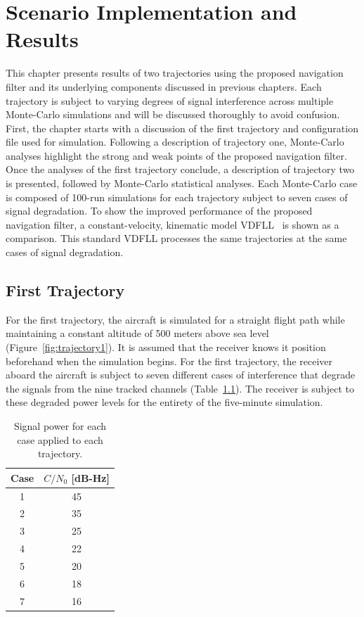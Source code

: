\chapter{\textbf{Scenario Implementation and Results}}
This chapter presents results of two trajectories using the proposed navigation filter and its underlying components discussed in previous chapters. Each trajectory is subject to varying degrees of signal interference across multiple Monte-Carlo simulations and will be discussed thoroughly to avoid confusion. First, the chapter starts with a discussion of the first trajectory and configuration file used for simulation. Following a description of trajectory one, Monte-Carlo analyses highlight the strong and weak points of the proposed navigation filter. Once the analyses of the first trajectory conclude, a description of trajectory two is presented, followed by Monte-Carlo statistical analyses. Each Monte-Carlo case is composed of 100-run simulations for each trajectory subject to seven cases of signal degradation. To show the improved performance of the proposed navigation filter, a constant-velocity, kinematic model VDFLL~\cite{grierPositionNavigationTiming} is shown as a comparison. This standard VDFLL processes the same trajectories at the same cases of signal degradation.

\section{\textbf{First Trajectory}}
For the first trajectory, the aircraft is simulated for a straight flight path while maintaining a constant altitude of 500 meters above sea level (Figure~\ref{fig:trajectory1}). It is assumed that the receiver knows it position beforehand when the simulation begins. For the first trajectory, the receiver aboard the aircraft is subject to seven different cases of interference that degrade the signals from the nine tracked channels (Table~\ref{tbl:interferenceCases}). The receiver is subject to these degraded power levels for the entirety of the five-minute simulation.

\begin{table}[!ht]
    \caption{Signal power for each case applied to each trajectory.}\label{tbl:interferenceCases}
    \centering
    \begin{tabular}{cc}
        \toprule
        Case & \(C/N_0\) [dB-Hz] \\
        \midrule
        1    & 45                \\
        2    & 35                \\
        3    & 25                \\
        4    & 22                \\
        5    & 20                \\
        6    & 18                \\
        7    & 16                \\
        \bottomrule
    \end{tabular}
\end{table}

